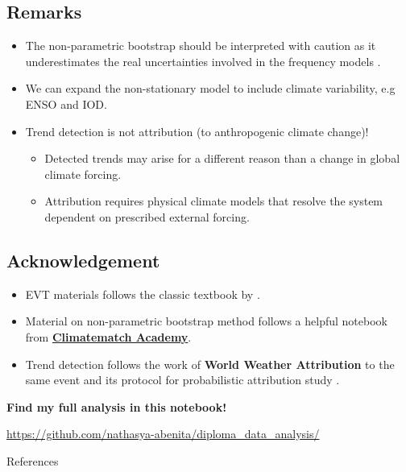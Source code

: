 \documentclass[
11pt,notheorems,hyperref={pdfauthor=whatever}
]{beamer}
\begin{document}
\subsection{Remarks}
\begin{frame}
    \begin{itemize}
        \item The non-parametric bootstrap should be interpreted with caution as it underestimates the real uncertainties involved in the frequency models \citep{kysely2008}.
        \item We can expand the non-stationary model to include climate variability, e.g ENSO and IOD.
        \item Trend detection is not attribution (to anthropogenic climate change)! 
        \begin{itemize}
            \item Detected trends may arise for a different reason than a change in global climate forcing.
            \item Attribution requires physical climate models that resolve the system dependent on prescribed external forcing.
        \end{itemize}
    \end{itemize}
\end{frame}

\subsection{Acknowledgement}
\begin{frame}
\begin{itemize}
    \item EVT materials follows the classic textbook by \textbf{\citet{coles2001}}.
    \item Material on non-parametric bootstrap method follows a helpful notebook from \textbf{\href{https://comptools.climatematch.io/tutorials/W2D3_ExtremesandVariability/student/W2D3_Tutorial2.html}{Climatematch Academy}}.
    \item Trend detection follows the work of \textbf{World Weather Attribution} to the same event \citep{wwa} and its protocol for probabilistic attribution study \citep{philip2020protocol}.
\end{itemize}

\centering
\bigskip
\bigskip
\textbf{Find my full analysis in this notebook!}

\url{https://github.com/nathasya-abenita/diploma_data_analysis/}
\end{frame}

\begin{frame}[allowframebreaks]{References}
    \printbibliography
\end{frame}
\end{document}
